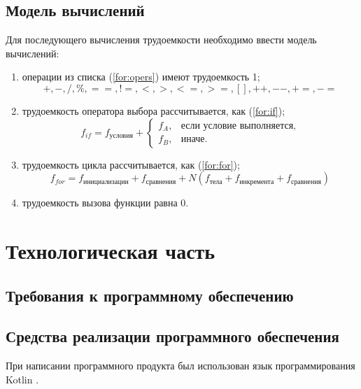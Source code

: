 \documentclass[12pt]{report}
\begin{document}
\newpage
\section{Модель вычислений}

Для последующего вычисления трудоемкости необходимо ввести модель вычислений:
\begin{enumerate}
    \item операции из списка (\ref{for:opers}) имеют трудоемкость 1;
        \begin{equation}
            \label{for:opers}
            +, -, /, \%, ==, !=, <, >, <=, >=, [], ++, {-}-, +=, -=
        \end{equation}
    \item трудоемкость оператора выбора  рассчитывается, как (\ref{for:if});
	\begin{equation}
        \label{for:if}
        f_{if} = f_{\text{условия}} +
        \begin{cases}
        f_A, & \text{если условие выполняется,}\\
        f_B, & \text{иначе.}
        \end{cases}
	\end{equation}
\item трудоемкость цикла рассчитывается, как (\ref{for:for});
    \begin{equation}
        \label{for:for}
        f_{for} = f_{\text{инициализации}} + f_{\text{сравнения}} + N(f_{\text{тела}} + f_{\text{инкремента}} + f_{\text{сравнения}})
    \end{equation}
	\item трудоемкость вызова функции равна 0.
\end{enumerate}


\chapter{Технологическая часть}
\section{Требования к программному обеспечению}

\section{Средства реализации программного обеспечения}
При написании программного продукта был использован язык программирования Kotlin \cite{Kotlin}.
\end{document}
